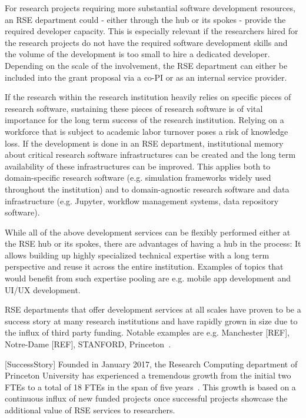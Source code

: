 \documentclass[a4paper]{article}
\makeatletter
\newcommand*{\eg}{e.g.\@\xspace}
\makeatother
\begin{document}
For research projects requiring more substantial software development resources, an RSE department could - either through the hub or its spokes - provide the required developer capacity.
This is especially relevant if the researchers hired for the research projects do not have the required software development skills and the volume of the development is too small to hire a dedicated developer.
Depending on the scale of the involvement, the RSE department can either be included into the grant proposal via a co-PI or as an internal service provider.

If the research within the research institution heavily relies on specific pieces of research software,
sustaining these pieces of research software is of vital importance for the long term success of the research institution.
Relying on a workforce that is subject to academic labor turnover poses a risk of knowledge loss.
If the development is done in an RSE department, institutional memory about critical research software infrastructures can be created and the long term availability of these infrastructures can be improved.
This applies both to domain-specific research software (e.g. simulation frameworks widely used throughout the institution)
and to domain-agnostic research software and data infrastructure (\eg Jupyter, workflow management systems, data repository software).

While all of the above development services can be flexibly performed either at the RSE hub or its spokes, there are advantages of having a hub in the process:
It allows building up highly specialized technical expertise with a long term perspective and reuse it across the entire institution.
Examples of topics that would benefit from such expertise pooling are \eg mobile app development and UI/UX development.

RSE departments that offer development services at all scales have proven to be a success story at many research institutions and have rapidly grown in size due to the influx of third party funding.
Notable examples are \eg Manchester [REF], Notre-Dame [REF], STANFORD, Princeton~\autocite{Cosden2022a}.

[SuccessStory]
Founded in January 2017, the Research Computing department of Princeton University has experienced a tremendous growth from the initial two FTEs to a total of 18 FTEs in the span of five years~\autocite{Cosden2022a}.
This growth is based on a continuous influx of new funded projects once successful projects showcase the additional value of RSE services to researchers.
\end{document}
